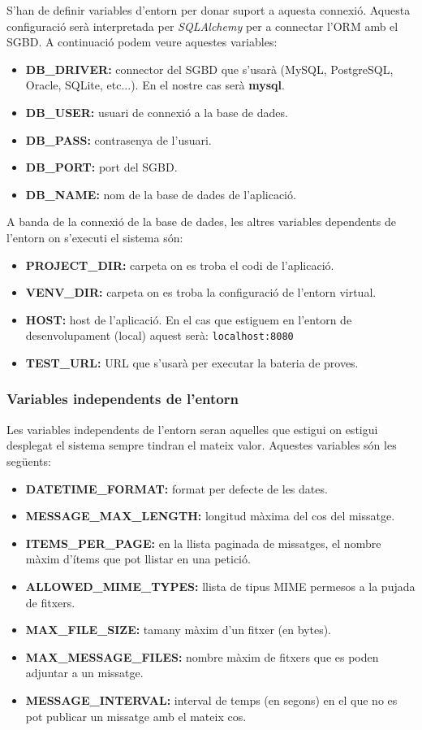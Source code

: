 S'han de definir variables d'entorn per donar suport a aquesta connexió. Aquesta configuració serà interpretada per \emph{SQLAlchemy} per a connectar l'\ac{ORM} amb el \ac{SGBD}. A continuació podem veure aquestes variables:

\begin{itemize}
	\item \textbf{DB\_DRIVER:} connector del \ac{SGBD} que s'usarà (MySQL, PostgreSQL, Oracle, SQLite, etc...). En el nostre cas serà \textbf{mysql}.
	\item \textbf{DB\_USER:} usuari de connexió a la base de dades.
	\item \textbf{DB\_PASS:} contrasenya de l'usuari.
	\item \textbf{DB\_PORT:} port del \ac{SGBD}.
	\item \textbf{DB\_NAME:} nom de la base de dades de l'aplicació.
\end{itemize}

A banda de la connexió de la base de dades, les altres variables dependents de l'entorn on s'executi el sistema són:
\begin{itemize}
	\item \textbf{PROJECT\_DIR:} carpeta on es troba el codi de l'aplicació.
	\item \textbf{VENV\_DIR:} carpeta on es troba la configuració de l'entorn virtual.
	\item \textbf{HOST:} host de l'aplicació. En el cas que estiguem en l'entorn de desenvolupament (local) aquest serà: \texttt{localhost:8080}
	\item \textbf{TEST\_URL:} \ac{URL} que s'usarà per executar la bateria de proves.
\end{itemize}

\subsubsection{Variables independents de l'entorn}
Les variables independents de l'entorn seran aquelles que estigui on estigui desplegat el sistema sempre tindran el mateix valor. Aquestes variables són les següents:

\begin{itemize}	
	
	\item \textbf{DATETIME\_FORMAT:} format per defecte de les dates. 
	\item \textbf{MESSAGE\_MAX\_LENGTH:} longitud màxima del cos del missatge.
	\item \textbf{ITEMS\_PER\_PAGE:} en la llista paginada de missatges, el nombre màxim d'ítems que pot llistar en una petició.
	\item \textbf{ALLOWED\_MIME\_TYPES:} llista de tipus \ac{MIME} permesos a la pujada de fitxers.
	\item \textbf{MAX\_FILE\_SIZE:} tamany màxim d'un fitxer (en bytes).
	\item \textbf{MAX\_MESSAGE\_FILES:} nombre màxim de fitxers que es poden adjuntar a un missatge.
	\item \textbf{MESSAGE\_INTERVAL:} interval de temps (en segons) en el que no es pot publicar un missatge amb el mateix cos.
\end{itemize}

